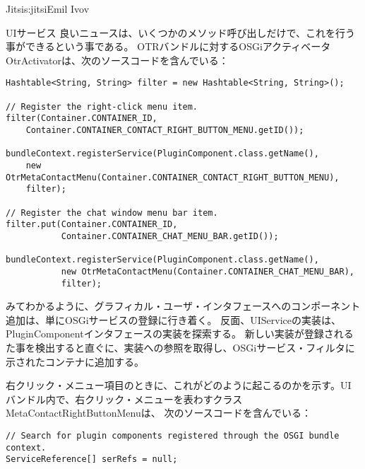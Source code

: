 \begin{aosachapter}{Jitsi}{s:jitsi}{Emil Ivov}
\begin{aosasect1}{UIサービス}
良いニュースは、いくつかのメソッド呼び出しだけで、これを行う事ができるという事である。
OTRバンドルに対するOSGiアクティベータ OtrActivatorは、次のソースコードを含んでいる：

\begin{verbatim}
Hashtable<String, String> filter = new Hashtable<String, String>();

// Register the right-click menu item.
filter(Container.CONTAINER_ID,
    Container.CONTAINER_CONTACT_RIGHT_BUTTON_MENU.getID());

bundleContext.registerService(PluginComponent.class.getName(),
    new OtrMetaContactMenu(Container.CONTAINER_CONTACT_RIGHT_BUTTON_MENU),
    filter);

// Register the chat window menu bar item.
filter.put(Container.CONTAINER_ID,
           Container.CONTAINER_CHAT_MENU_BAR.getID());

bundleContext.registerService(PluginComponent.class.getName(),
           new OtrMetaContactMenu(Container.CONTAINER_CHAT_MENU_BAR),
           filter);
\end{verbatim}

みてわかるように、グラフィカル・ユーザ・インタフェースへのコンポーネント追加は、単にOSGiサービスの登録に行き着く。
反面、UIServiceの実装は、PluginComponentインタフェースの実装を探索する。
新しい実装が登録されるた事を検出すると直ぐに、実装への参照を取得し、OSGiサービス・フィルタに示されたコンテナに追加する。

右クリック・メニュー項目のときに、これがどのように起こるのかを示す。UIバンドル内で、右クリック・メニューを表わすクラス MetaContactRightButtonMenuは、
次のソースコードを含んでいる：

\begin{verbatim}
// Search for plugin components registered through the OSGI bundle context.
ServiceReference[] serRefs = null;


\end{verbatim}
\end{aosasect1}
\end{aosachapter}
